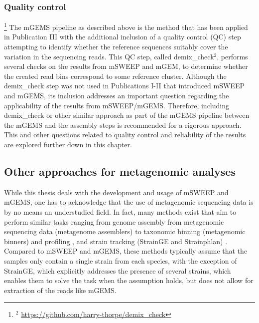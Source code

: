 \documentclass[officiallayout]{tktla}
\begin{document}
\subsubsection{Quality control}

\noindent\let\thefootnote\relax\footnote{$^{2}$ \url{https://github.com/harry-thorpe/demix_check}}
The mGEMS pipeline as described above is the method that has been
applied in Publication III with the additional inclusion of a quality
control (QC) step attempting to identify whether the reference
sequences suitably cover the variation in the sequencing reads. This
QC step, called demix\_check$^{2}$, performs several checks on the results from mSWEEP and
mGEM, to determine whether the created read bins correspond to some
reference cluster. Although the demix\_check step was not used in
Publications I-II that introduced mSWEEP and mGEMS, its inclusion
addresses an important question regarding the applicability of the
results from mSWEEP/mGEMS. Therefore, including demix\_check \textemdash{ } or other
similar approach \textemdash{ } as part of the mGEMS pipeline between
the mGEMS and the assembly steps is recommended for a rigorous
approach. This and other questions related to quality control and
reliability of the results are explored further down in this
chapter.

\subsection{Other approaches for metagenomic analyses}
\label{other-metagenomics-approaches}
While this thesis deals with the development and usage of mSWEEP and
mGEMS, one has to acknowledge that the use of metagenomic sequencing
data is by no means an understudied field. In fact, many methods exist
that aim to perform similar tasks ranging from genome assembly from
metagenomic sequencing data (metagenome assemblers)
\citep{peng2012idba, li2015megahit, nurk2017metaspades} to taxonomic
binning (metagenomic binners) \citep{kang2019metabat, wu2016maxbin,
  sieber2018recovery} and profiling \citep{beghini2021integrating,
  van2022strainge}, and strain tracking (StrainGE and Strainphlan)
\citep{truong2017microbial, van2022strainge}. Compared to mSWEEP and
mGEMS, these methods typically assume that the samples only contain a
single strain from each species, with the exception of StrainGE, which
explicitly addresses the presence of several strains, which enables
them to solve the task when the assumption holds, but does not allow
for extraction of the reads like mGEMS.
\end{document}
